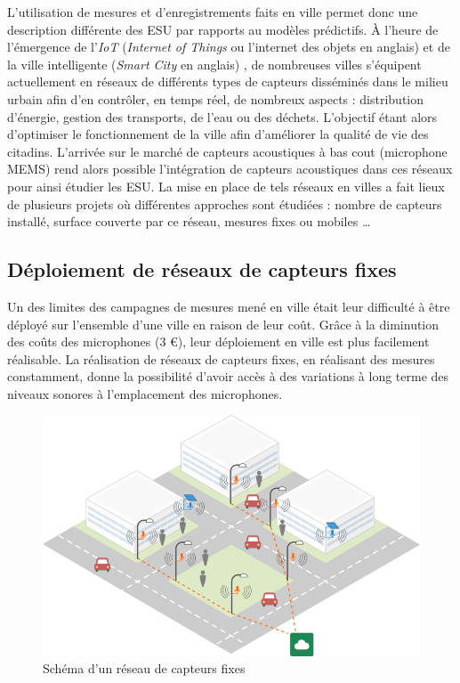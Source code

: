 L'utilisation de mesures et d'enregistrements faits en ville permet donc une description différente des ESU par rapports au modèles prédictifs. À l'heure de l'émergence de l'\textit{IoT} (\textit{Internet of Things} ou l'internet des objets en anglais) \cite{zanella2014internet} et de la ville intelligente (\textit{Smart City} en anglais) \cite{chourabi2012understanding}, de nombreuses villes s'équipent actuellement en réseaux de différents types de capteurs disséminés dans le milieu urbain afin d'en contrôler, en temps réel, de nombreux aspects : distribution d'énergie, gestion des transports, de l'eau ou des déchets. L'objectif étant alors d'optimiser le fonctionnement de la ville afin d'améliorer la qualité de vie des citadins. L'arrivée sur le marché de capteurs acoustiques à bas cout (microphone MEMS)  \cite{van2010use} rend alors possible l'intégration de capteurs acoustiques dans ces réseaux pour ainsi étudier les ESU. La mise en place de tels réseaux en  villes a fait lieux de plusieurs projets où différentes approches sont étudiées : nombre de capteurs installé, surface couverte par ce réseau, mesures fixes ou mobiles \dots

\subsection{Déploiement de réseaux de capteurs fixes}

Un des limites des campagnes de mesures mené en ville était leur difficulté à être déployé sur l'ensemble d'une ville en raison de leur coût. Grâce à la diminution des coûts des microphones (3 €), leur déploiement en ville est plus facilement réalisable. La réalisation de réseaux de capteurs fixes, en réalisant des mesures constamment, donne la possibilité d'avoir accès à des variations à long terme des niveaux sonores à l'emplacement des microphones. 

\begin{figure}[t]
\centering
\includegraphics[width=0.8\linewidth]{./figures/cartographie/reseau_mesure.png}
\caption[Schéma d'un réseau de capteurs fixes]{Schéma d'un réseau de capteurs fixes\protect\footnotemark}
\label{fig:reseau_capteur}
\end{figure}

